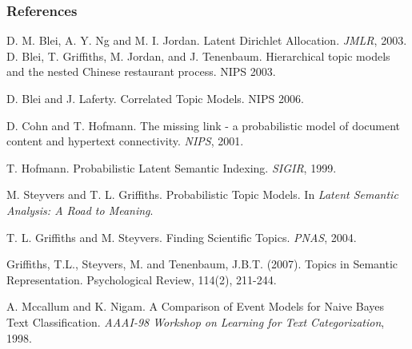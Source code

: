 \documentclass[10pt, svgnames]{beamer}
\begin{document}
		\begin{frame}
\frametitle{References}
\footnotesize{
\begin{thebibliography}{Blei et al, 2003}

D. M. Blei, A. Y. Ng and M. I. Jordan.
Latent Dirichlet Allocation.
{\it JMLR}, 2003.
D. Blei, T. Griffiths, M. Jordan, and J. Tenenbaum. Hierarchical
	topic models and the nested Chinese restaurant process. NIPS 2003.

 D. Blei and J. Laferty. Correlated Topic Models. NIPS 2006.

D. Cohn and T. Hofmann.
The missing link - a probabilistic model of document content and hypertext connectivity.
{\it NIPS}, 2001.

T. Hofmann.
Probabilistic Latent Semantic Indexing.
{\it SIGIR}, 1999.

M. Steyvers and T. L. Griffiths.
Probabilistic Topic Models. 
In {\it Latent Semantic Analysis: A Road to Meaning}.

T. L. Griffiths and M. Steyvers.
Finding Scientific Topics.
{\it PNAS}, 2004.

	Griffiths, T.L., Steyvers, M. and Tenenbaum, J.B.T. (2007). Topics in
	Semantic Representation. Psychological Review, 114(2), 211-244. 
	
A. Mccallum and K. Nigam.
A Comparison of Event Models for Naive Bayes Text Classification.
{\it AAAI-98 Workshop on Learning for Text Categorization}, 1998.

\end{thebibliography}
}
\end{frame}
\end{document}
